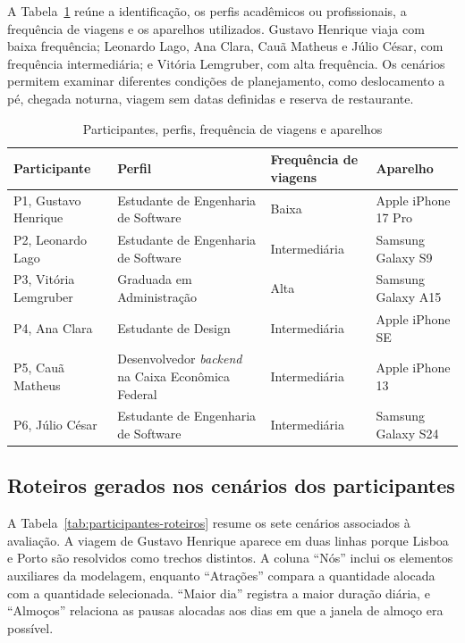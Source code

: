 A Tabela~\ref{tab:participantes} reúne a identificação, os perfis acadêmicos ou profissionais, a frequência de viagens e os aparelhos utilizados. Gustavo Henrique viaja com baixa frequência; Leonardo Lago, Ana Clara, Cauã Matheus e Júlio César, com frequência intermediária; e Vitória Lemgruber, com alta frequência. Os cenários permitem examinar diferentes condições de planejamento, como deslocamento a pé, chegada noturna, viagem sem datas definidas e reserva de restaurante.

\begin{table}[H]
\centering
\small
\caption{Participantes, perfis, frequência de viagens e aparelhos}
\label{tab:participantes}
\begin{tabularx}{\textwidth}{>{\raggedright\arraybackslash}p{3.2cm}>{\raggedright\arraybackslash}X>{\raggedright\arraybackslash}p{2.3cm}>{\raggedright\arraybackslash}p{3.2cm}}
\hline
\textbf{Participante} & \textbf{Perfil} & \textbf{Frequência de viagens} & \textbf{Aparelho} \\
\hline
P1, Gustavo Henrique & Estudante de Engenharia de Software & Baixa & Apple iPhone 17 Pro \\
P2, Leonardo Lago & Estudante de Engenharia de Software & Intermediária & Samsung Galaxy S9 \\
P3, Vitória Lemgruber & Graduada em Administração & Alta & Samsung Galaxy A15 \\
P4, Ana Clara & Estudante de Design & Intermediária & Apple iPhone SE \\
P5, Cauã Matheus & Desenvolvedor \textit{backend} na Caixa Econômica Federal & Intermediária & Apple iPhone 13 \\
P6, Júlio César & Estudante de Engenharia de Software & Intermediária & Samsung Galaxy S24 \\
\hline
\end{tabularx}
\end{table}

\subsection{Roteiros gerados nos cenários dos participantes}

A Tabela~\ref{tab:participantes-roteiros} resume os sete cenários associados à avaliação. A viagem de Gustavo Henrique aparece em duas linhas porque Lisboa e Porto são resolvidos como trechos distintos. A coluna ``Nós'' inclui os elementos auxiliares da modelagem, enquanto ``Atrações'' compara a quantidade alocada com a quantidade selecionada. ``Maior dia'' registra a maior duração diária, e ``Almoços'' relaciona as pausas alocadas aos dias em que a janela de almoço era possível.

